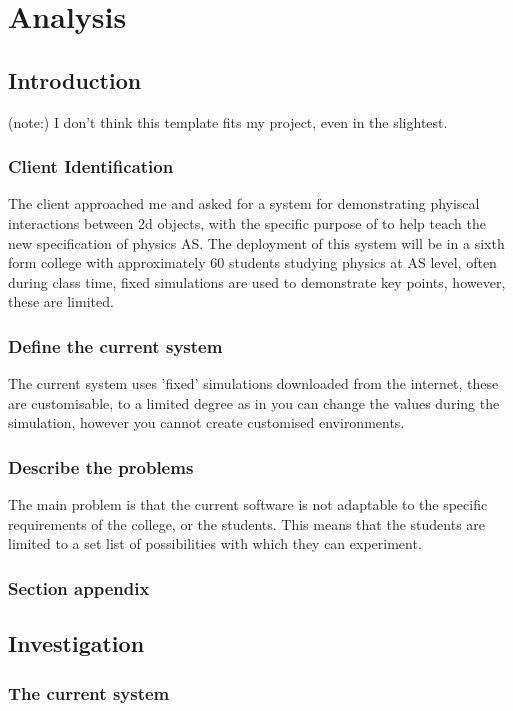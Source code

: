 \chapter{Analysis}

\section{Introduction}
(note:) I don't think this template fits my project, even in the slightest. 
\subsection{Client Identification}
The client approached me and asked for a system for demonstrating phyiscal interactions between 2d objects, with the specific purpose of to help teach the new specification of physics AS. The deployment of this system will be in a sixth form college with approximately 60 students studying physics at AS level, often during class time, fixed simulations are used to demonstrate key points, however, these are limited.
\subsection{Define the current system}
The current system uses 'fixed' simulations downloaded from the internet, these are customisable, to a limited degree as in you can change the values during the simulation, however you cannot create customised environments.
\subsection{Describe the problems}
The main problem is that the current software is not adaptable to the specific requirements of the college, or the students. This means that the students are limited to a set list of possibilities with which they can experiment.
\subsection{Section appendix}

\section{Investigation}

\subsection{The current system}

